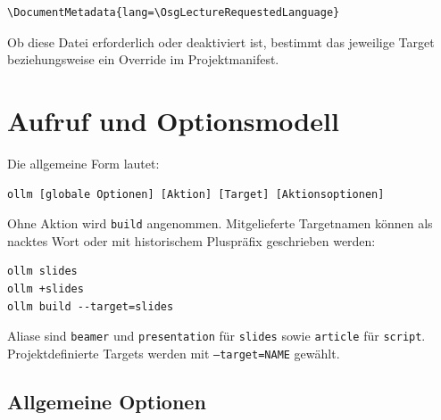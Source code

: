 \documentclass[
load-preamble+
]{osgdoc}
\begin{document}
\begin{verbatim}
\DocumentMetadata{lang=\OsgLectureRequestedLanguage}
\end{verbatim}

Ob diese Datei erforderlich oder deaktiviert ist, bestimmt das jeweilige
Target beziehungsweise ein Override im Projektmanifest.

\section{Aufruf und Optionsmodell}

Die allgemeine Form lautet:

\begin{verbatim}
ollm [globale Optionen] [Aktion] [Target] [Aktionsoptionen]
\end{verbatim}

Ohne Aktion wird \texttt{build} angenommen. Mitgelieferte Targetnamen können
als nacktes Wort oder mit historischem Pluspräfix geschrieben werden:

\begin{verbatim}
ollm slides
ollm +slides
ollm build --target=slides
\end{verbatim}

Aliase sind \texttt{beamer} und \texttt{presentation} für \texttt{slides}
sowie \texttt{article} für \texttt{script}. Projektdefinierte Targets werden
mit \texttt{--target=NAME} gewählt.

\subsection{Allgemeine Optionen}
\end{document}
